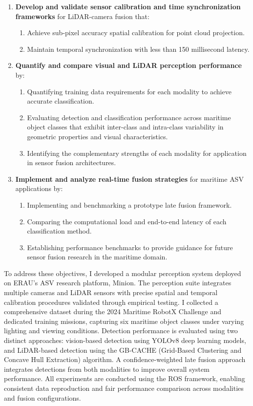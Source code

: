 \documentclass[../main.tex]{subfiles}
\begin{document}
\begin{enumerate}
    \item \textbf{Develop and validate sensor calibration and time synchronization frameworks} for \ac{LiDAR}-camera fusion that:
    \begin{enumerate}
        \item Achieve sub-pixel accuracy spatial calibration for point cloud projection.
        \item Maintain temporal synchronization with less than 150 millisecond latency.
    \end{enumerate}

    \item \textbf{Quantify and compare visual and \ac{LiDAR} perception performance} by:
    \begin{enumerate}
        \item Quantifying training data requirements for each modality to achieve accurate classification.
        \item Evaluating detection and classification performance across maritime object classes that exhibit inter-class and intra-class variability in geometric properties and visual characteristics.
        \item Identifying the complementary strengths of each modality for application in sensor fusion architectures.
    \end{enumerate}

    \item \textbf{Implement and analyze real-time fusion strategies} for maritime \ac{ASV} applications by:
    \begin{enumerate}
        \item Implementing and benchmarking a prototype late fusion framework.
        \item Comparing the computational load and end-to-end latency of each classification method.
        \item Establishing performance benchmarks to provide guidance for future sensor fusion research in the maritime domain.
    \end{enumerate}
\end{enumerate}

To address these objectives, I developed a modular perception system deployed on \ac{ERAU}'s \ac{ASV} research platform, Minion.
The perception suite integrates multiple cameras and \ac{LiDAR} sensors with precise spatial and temporal calibration procedures validated through empirical testing.
I collected a comprehensive dataset during the 2024 Maritime RobotX Challenge and dedicated training missions, capturing six maritime object classes under varying lighting and viewing conditions.
Detection performance is evaluated using two distinct approaches: vision-based detection using YOLOv8 deep learning models, and \ac{LiDAR}-based detection using the GB-CACHE (Grid-Based Clustering and Concave Hull Extraction) algorithm.
A confidence-weighted late fusion approach integrates detections from both modalities to improve overall system performance.
All experiments are conducted using the \ac{ROS} framework, enabling consistent data reproduction and fair performance comparison across modalities and fusion configurations.
\end{document}
